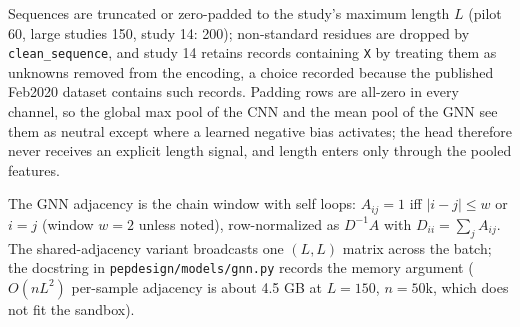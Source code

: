 Sequences are truncated or zero-padded to the study's maximum length $L$
(pilot 60, large studies 150, study 14: 200); non-standard residues are
dropped by \texttt{clean\_sequence}, and study 14 retains records
containing \texttt{X} by treating them as unknowns removed from the
encoding, a choice recorded because the published Feb2020 dataset contains
such records. Padding rows are all-zero in every channel, so the global
max pool of the CNN and the mean pool of the GNN see them as neutral
except where a learned negative bias activates; the head therefore never
receives an explicit length signal, and length enters only through the
pooled features.

The GNN adjacency is the chain window with self loops: $A_{ij} = 1$ iff
$|i-j| \le w$ or $i = j$ (window $w=2$ unless noted), row-normalized as
$D^{-1}A$ with $D_{ii} = \sum_j A_{ij}$. The shared-adjacency variant
broadcasts one $(L,L)$ matrix across the batch; the docstring in
\texttt{pepdesign/models/gnn.py} records the memory argument
($O(nL^2)$ per-sample adjacency is about 4.5 GB at $L{=}150$, $n{=}50$k,
which does not fit the sandbox).
